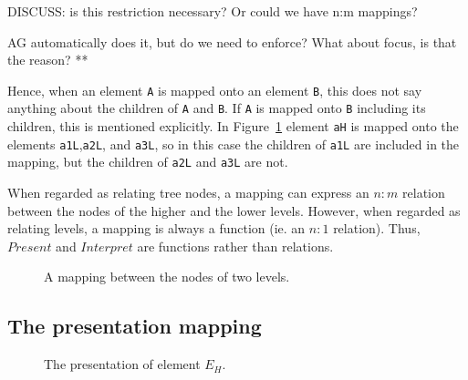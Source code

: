 DISCUSS: is this restriction necessary? Or could we have n:m mappings?

AG automatically does it, but do we need to enforce? What about focus, is that the reason?
**
\fromHere  %


\bc
Hence, when an element \verb|A| is mapped onto an element \verb|B|, this does not say anything about the children of \verb|A| and \verb|B|. If \verb|A| is mapped onto \verb|B| including its children, this is mentioned explicitly. In Figure~\ref{nodeMapping} element \verb|aH| is mapped onto the elements \verb|a1L|,\verb|a2L|, and \verb|a3L|, so in this case the children of \verb|a1L| are included in the mapping, but the children of \verb|a2L| and \verb|a3L| are not. 
\ec

\bc
When regarded as relating tree nodes, a mapping can express an $n:m$ relation between the nodes of the higher and the lower levels. However, when regarded as relating levels, a mapping is always a function (ie. an $n:1$ relation). Thus, $Present$ and $Interpret$ are functions rather than relations.
\ec

\begin{figure}
\begin{center}
\begin{center}
\end{center}
\caption{A mapping between the nodes of two levels.}\label{nodeMapping} 
\end{center}
\end{figure}



%																
\subsection{The presentation mapping}

\begin{figure}
\begin{center}
\begin{center}
%                    
\end{center}
\caption{The presentation of element $E_H$.}\label{elementPresentation} 
\end{center}
\end{figure}

